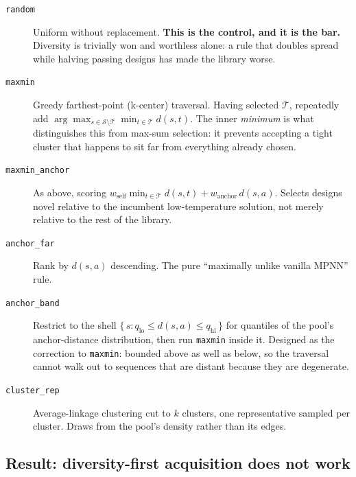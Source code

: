 \begin{description}
  \item[\texttt{random}] Uniform without replacement. \textbf{This is the
        control, and it is the bar.} Diversity is trivially won and worthless
        alone: a rule that doubles spread while halving passing designs has made
        the library worse.
  \item[\texttt{maxmin}] Greedy farthest-point (k-center) traversal. Having
        selected $\mathcal{T}$, repeatedly add
        $\arg\max_{s \in \mathcal{S} \setminus \mathcal{T}}
         \min_{t \in \mathcal{T}} d(s,t)$.
        The inner \emph{minimum} is what distinguishes this from max-sum
        selection: it prevents accepting a tight cluster that happens to sit far
        from everything already chosen.
  \item[\texttt{maxmin\_anchor}] As above, scoring
        $w_{\mathrm{self}} \min_{t \in \mathcal{T}} d(s,t) + w_{\mathrm{anchor}}\, d(s,a)$.
        Selects designs novel relative to the incumbent low-temperature
        solution, not merely relative to the rest of the library.
  \item[\texttt{anchor\_far}] Rank by $d(s,a)$ descending. The pure
        ``maximally unlike vanilla MPNN'' rule.
  \item[\texttt{anchor\_band}] Restrict to the shell
        $\{\, s : q_{\mathrm{lo}} \le d(s,a) \le q_{\mathrm{hi}} \,\}$ for
        quantiles of the pool's anchor-distance distribution, then run
        \texttt{maxmin} inside it. Designed as the correction to
        \texttt{maxmin}: bounded above as well as below, so the traversal cannot
        walk out to sequences that are distant because they are degenerate.
  \item[\texttt{cluster\_rep}] Average-linkage clustering cut to $k$ clusters,
        one representative sampled per cluster. Draws from the pool's density
        rather than its edges.
\end{description}

\subsection*{Result: diversity-first acquisition does not work}


